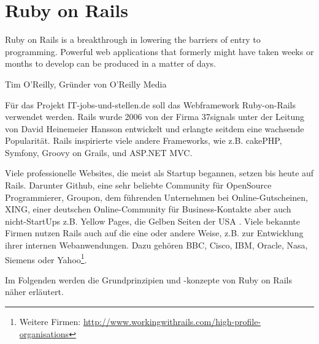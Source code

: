 
\section{Ruby on Rails}
\label{sec:rails}
\epigraph{Ruby on Rails is a breakthrough in lowering the barriers of entry to programming. Powerful web applications that formerly might have taken weeks or months to develop can be produced in a matter of days.}{Tim O'Reilly, Gründer von O'Reilly Media}
\label{sec:rails}

Für das Projekt IT-jobs-und-stellen.de soll das Webframework Ruby-on-Rails verwendet werden. Rails wurde 2006 von der Firma 37signals unter der Leitung von David Heinemeier Hansson entwickelt und erlangte seitdem eine wachsende Popularität. Rails inspirierte viele andere Frameworks, wie z.B. cakePHP, Symfony, Groovy on Grails, und ASP.NET MVC.

Viele professionelle Websites, die meist als Startup begannen, setzen bis heute auf Rails. Darunter Github, eine sehr beliebte Community für OpenSource Programmierer,  Groupon, dem führenden Unternehmen bei Online-Gutscheinen, XING, einer deutschen Online-Community für Business-Kontakte aber auch nicht-StartUps z.B. Yellow Pages, die Gelben Seiten der USA \citep{ruby_on_rails_2011}. Viele bekannte Firmen nutzen Rails auch auf die eine oder andere Weise, z.B. zur Entwicklung ihrer internen Webanwendungen. Dazu gehören BBC, Cisco, IBM, Oracle, Nasa, Siemens oder Yahoo\footnote{Weitere Firmen: \url{http://www.workingwithrails.com/high-profile-organisations}}.

Im Folgenden werden die Grundprinzipien und -konzepte von Ruby on Rails näher erläutert.


